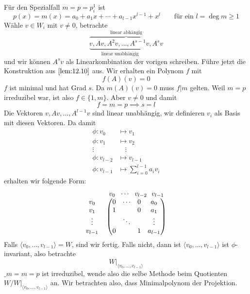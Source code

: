 \documentclass{mycourse}
\begin{document}
\begin{ex}
\begin{enumerate}[1{. Schritt}]
			Für den Spezialfall $m=p=p_i^1$ ist
			\[
				p(x) = m(x) = a_0+a_1x+\dotsb + a_{l-1}x^{l-1} +x^l \qquad \text{für ein $l=\deg m\ge 1$}
			\]
			Wähle $v\in W_i$ mit $v\neq 0$, betrachte
			\[
				\overbrace{\underbrace{v,Av,A^2v,\dotsc,A^{s-1}v}_{\text{ linear unabhängig}},A^sv}^{\text{linear abhängig}}
			\]
			und wir können $A^sv$ als Linearkombination der vorigen schreiben.
			Führe jetzt die Konstruktion aus $\ref{lem:12.10}$ aus.
			Wir erhalten ein Polynom $f$ mit
			\[
				f(A)(v)=0
			\]
			$f$ ist minimal und hat Grad $s$.
			Da $m(A)(v)=0$ muss $f|m$ gelten.
			Weil $m=p$ irreduzibel war, ist also $f\in \{1,m\}$.
			Aber $v\neq 0$ und damit
			\[
				f=m=p \implies s=l
			\]
			Die Vektoren $v,Av,\dotsc,A^{l-1}v$ sind linear unabhängig, wir definieren $v_i$ als Basis mit diesen Vektoren.
			Da damit
			\begin{align*}
				\phi:v_0 &\mapsto v_1\\
				\phi:v_1 &\mapsto v_2\\
				\vdots \quad & \quad \vdots\\
				\phi:v_{l-2} &\mapsto v_{l-1}\\
				\phi:v_{l-1} &\mapsto \sum_{i=0}^{l-1} a_iv_i
			\end{align*}
			erhalten wir folgende Form:
			\[
				\begin{tabular}{*{3}{>{$}c<{$}}}
					& \begin{matrix} v_0 & \!\cdots\! & v_{l-2}\!  & \!v_{l-1}  \end{matrix} \\
				 \begin{matrix} v_0 \\ v_1 \\ \vdots \\ v_{l-1} \end{matrix} &
				 \begin{pmatrix} 0 & \cdots  & 0 & a_0 \\ 1 &  & 0 & a_1 \\ & \ddots &  & \vdots \\ 0 &  & 1 & a_{l-1} \end {pmatrix}  
				\end{tabular}
			\]
			Falls $\langle v_0,\dotsc, v_{l-1}\rangle = W$, sind wir fertig.
			Falls nicht, dann ist $\langle v_0,\dotsc, v_{l-1}\rangle$ ist $\phi$-invariant, also betrachte
			\[
				W|_{\langle v_0,\dotsc,v_{l-1}\rangle}
			\]
			$\_m=m=p$ ist irreduzibel, wende also die selbe Methode beim Quotienten $W/W|_{\langle v_0,\dotsc,v_{l-1}\rangle}$ an. Wir betrachten also, dass Minimalpolynom
			der Projektion. %


\end{enumerate}
\end{ex}
\end{document}
